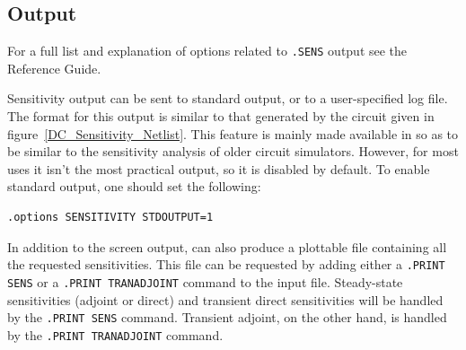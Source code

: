 \clearpage
\subsection{Output}
\label{SENS_Output}
For a full list and explanation of options related to \texttt{.SENS}
output see the \Xyce{} Reference Guide\ReferenceGuide{}.

Sensitivity output can be sent to standard output, or to a
user-specified log file.  The format for this output is similar to
that generated by the circuit given in
figure~\ref{DC_Sensitivity_Netlist}.  This feature is mainly made
available in \Xyce{} so as to be similar to the sensitivity analysis
of older circuit simulators.  However, for most uses it isn't the most
practical output, so it is disabled by default.  To enable standard
output, one should set the following:
\begin{verbatim}
.options SENSITIVITY STDOUTPUT=1
\end{verbatim}

In addition to the screen output, \Xyce{} can also produce a plottable
file containing all the requested sensitivities.  This file can be
requested by adding either a \texttt{.PRINT SENS} or a \texttt{.PRINT
  TRANADJOINT} command to the input file.  Steady-state sensitivities
(adjoint or direct) and transient direct sensitivities will be handled
by the \texttt{.PRINT SENS} command.  Transient adjoint, on the other
hand, is handled by the \texttt{.PRINT TRANADJOINT} command.

